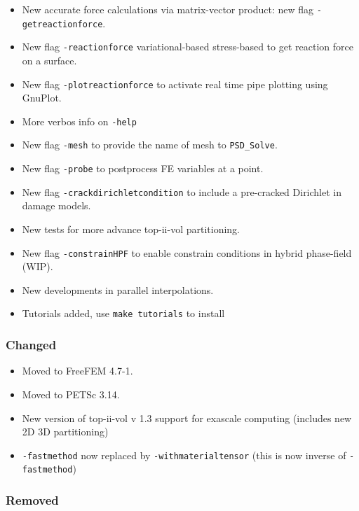 \begin{itemize}
\tightlist
\item
  New accurate force calculations via matrix-vector product: new flag
  \lstinline!-getreactionforce!.
\item
  New flag \lstinline!-reactionforce! variational-based \textbar{}
  stress-based to get reaction force on a surface.
\item
  New flag \lstinline!-plotreactionforce! to activate real time pipe
  plotting using GnuPlot.
\item
  More verbos info on \lstinline!-help!
\item
  New flag \lstinline!-mesh! to provide the name of mesh to
  \lstinline!PSD_Solve!.
\item
  New flag \lstinline!-probe! to postprocess FE variables at a point.
\item
  New flag \lstinline!-crackdirichletcondition! to include a pre-cracked
  Dirichlet in damage models.
\item
  New tests for more advance top-ii-vol partitioning.
\item
  New flag \lstinline!-constrainHPF! to enable constrain conditions in
  hybrid phase-field (WIP).
\item
  New developments in parallel interpolations.
\item
  Tutorials added, use \lstinline!make tutorials! to install
\end{itemize}

\subsubsection{Changed}

\begin{itemize}
\tightlist
\item
  Moved to FreeFEM 4.7-1.
\item
  Moved to PETSc 3.14.
\item
  New version of top-ii-vol v 1.3 support for exascale computing
  (includes new 2D 3D partitioning)
\item
  \lstinline!-fastmethod! now replaced by
  \lstinline!-withmaterialtensor! (this is now inverse of
  \lstinline!-fastmethod!)
\end{itemize}

\subsubsection{Removed}


